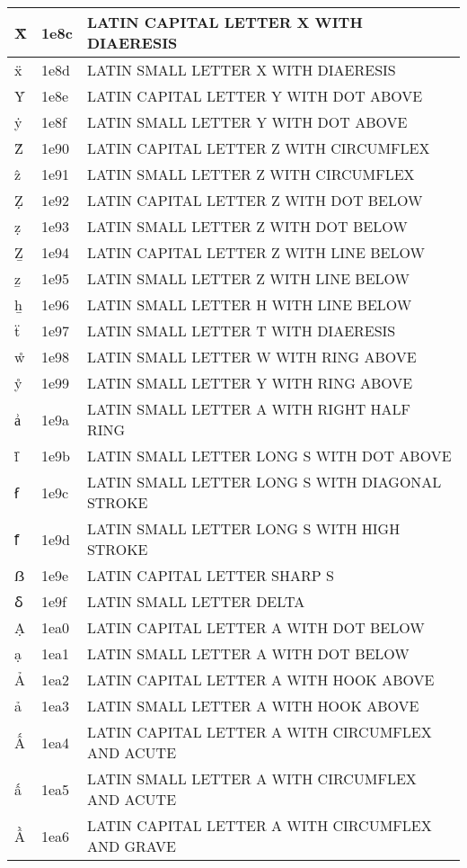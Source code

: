 \documentclass[12pt,letterpaper,openany]{book}
\begin{document}
\begin{center}
\begin{supertabular}{|m{0.25in}|m{0.5in}|m{4in}|}
Ẍ & 1e8c & LATIN CAPITAL LETTER X WITH DIAERESIS\\\hline
ẍ & 1e8d & LATIN SMALL LETTER X WITH DIAERESIS\\\hline
Ẏ & 1e8e & LATIN CAPITAL LETTER Y WITH DOT ABOVE\\\hline
ẏ & 1e8f & LATIN SMALL LETTER Y WITH DOT ABOVE\\\hline
Ẑ & 1e90 & LATIN CAPITAL LETTER Z WITH CIRCUMFLEX\\\hline
ẑ & 1e91 & LATIN SMALL LETTER Z WITH CIRCUMFLEX\\\hline
Ẓ & 1e92 & LATIN CAPITAL LETTER Z WITH DOT BELOW\\\hline
ẓ & 1e93 & LATIN SMALL LETTER Z WITH DOT BELOW\\\hline
Ẕ & 1e94 & LATIN CAPITAL LETTER Z WITH LINE BELOW\\\hline
ẕ & 1e95 & LATIN SMALL LETTER Z WITH LINE BELOW\\\hline
ẖ & 1e96 & LATIN SMALL LETTER H WITH LINE BELOW\\\hline
ẗ & 1e97 & LATIN SMALL LETTER T WITH DIAERESIS\\\hline
ẘ & 1e98 & LATIN SMALL LETTER W WITH RING ABOVE\\\hline
ẙ & 1e99 & LATIN SMALL LETTER Y WITH RING ABOVE\\\hline
ẚ & 1e9a & LATIN SMALL LETTER A WITH RIGHT HALF RING\\\hline
ẛ & 1e9b & LATIN SMALL LETTER LONG S WITH DOT ABOVE\\\hline
ẜ & 1e9c & LATIN SMALL LETTER LONG S WITH DIAGONAL STROKE\\\hline
ẝ & 1e9d & LATIN SMALL LETTER LONG S WITH HIGH STROKE\\\hline
ẞ & 1e9e & LATIN CAPITAL LETTER SHARP S\\\hline
ẟ & 1e9f & LATIN SMALL LETTER DELTA\\\hline
Ạ & 1ea0 & LATIN CAPITAL LETTER A WITH DOT BELOW\\\hline
ạ & 1ea1 & LATIN SMALL LETTER A WITH DOT BELOW\\\hline
Ả & 1ea2 & LATIN CAPITAL LETTER A WITH HOOK ABOVE\\\hline
ả & 1ea3 & LATIN SMALL LETTER A WITH HOOK ABOVE\\\hline
Ấ & 1ea4 & LATIN CAPITAL LETTER A WITH CIRCUMFLEX AND ACUTE\\\hline
ấ & 1ea5 & LATIN SMALL LETTER A WITH CIRCUMFLEX AND ACUTE\\\hline
Ầ & 1ea6 & LATIN CAPITAL LETTER A WITH CIRCUMFLEX AND GRAVE\\\hline

\end{supertabular}
\end{center}
\end{document}
